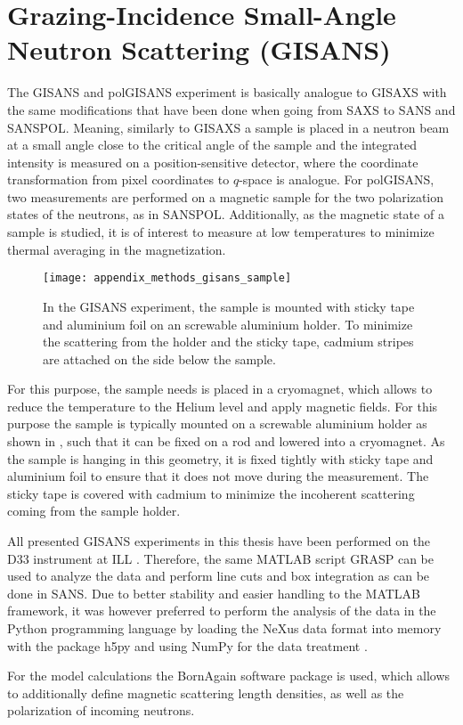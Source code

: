 \documentclass[\main/dresen_thesis.tex]{subfiles}
\begin{document}
  \section{Grazing-Incidence Small-Angle Neutron Scattering (GISANS)}
    \label{ch:methods:gisans}
    The GISANS and polGISANS experiment is basically analogue to GISAXS with the same modifications that have been done when going from SAXS to SANS and SANSPOL.
    Meaning, similarly to GISAXS a sample is placed in a neutron beam at a small angle close to the critical angle of the sample and the integrated intensity is measured on a position-sensitive detector, where the coordinate transformation from pixel coordinates to $q$-space is analogue.
    For polGISANS, two measurements are performed on a magnetic sample for the two polarization states of the neutrons, as in SANSPOL.
    Additionally, as the magnetic state of a sample is studied, it is of interest to measure at low temperatures to minimize thermal averaging in the magnetization.

    \begin{figure}[tb]
      \centering
      \texttt{[image: appendix\_methods\_gisans\_sample]}
      \caption{\label{fig:methods:gisans:samples}In the GISANS experiment, the sample is mounted with sticky tape and aluminium foil on an screwable aluminium holder. To minimize the scattering from the holder and the sticky tape, cadmium stripes are attached on the side below the sample.}
    \end{figure}

    For this purpose, the sample needs is placed in a cryomagnet, which allows to reduce the temperature to the Helium level and apply magnetic fields.
    For this purpose the sample is typically mounted on a screwable aluminium holder as shown in , such that it can be fixed on a rod and lowered into a cryomagnet.
    As the sample is hanging in this geometry, it is fixed tightly with sticky tape and aluminium foil to ensure that it does not move during the measurement.
    The sticky tape is covered with cadmium to minimize the incoherent scattering coming from the sample holder.

    All presented GISANS experiments in this thesis have been performed on the D33 instrument at ILL .
    Therefore, the same MATLAB script GRASP can be used to analyze the data and perform line cuts and box integration as can be done in SANS.
    Due to better stability and easier handling to the MATLAB framework, it was however preferred to perform the analysis of the data in the Python programming language by loading the NeXus data format into memory with the package h5py \cite{collette_2013_h5py} and using NumPy for the data treatment \cite{Oliphant_2006_Guide}.

    For the model calculations the BornAgain software package \cite{Burle_2018_borna} is used, which allows to additionally define magnetic scattering length densities, as well as the polarization of incoming neutrons.
\end{document}
